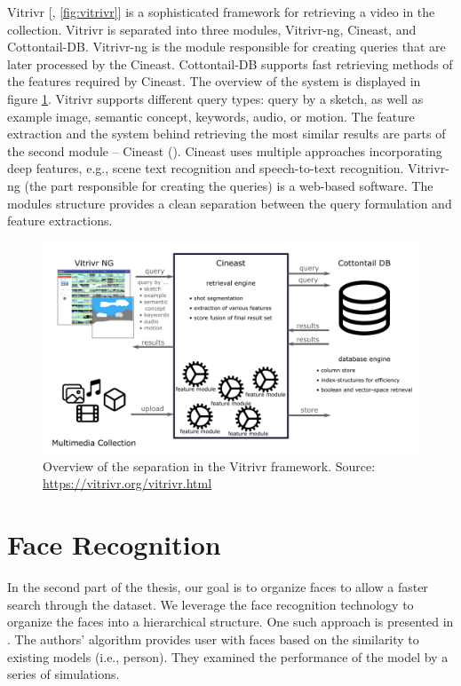 Vitrivr [\cite{rossetto2016vitrivr}, \autoref{fig:vitrivr}] is a sophisticated framework for retrieving a video in the collection. Vitrivr is separated into three modules, Vitrivr-ng, Cineast, and Cottontail-DB.  Vitrivr-ng is the module responsible for creating queries that are later processed by the Cineast. Cottontail-DB supports fast retrieving methods of the features required by Cineast. The overview of the system is displayed in figure \ref{fig:vitrivr}. Vitrivr supports different query types: query by a sketch, as well as example image, semantic concept, keywords, audio, or motion. The feature extraction and the system behind retrieving the most similar results are parts of the second module -- Cineast (\cite{rossetto2016searching}). Cineast uses multiple approaches incorporating deep features, e.g., scene text recognition and speech-to-text recognition. Vitrivr-ng (the part responsible for creating the queries) is a web-based software. The modules structure provides a clean separation between the query formulation and feature extractions.

\begin{figure}
    \centering
    \includegraphics[width=\linewidth]{img/vitrivr.png}
    \caption[Overview of the separation in the Vitrivr framework]{Overview of the separation in the Vitrivr framework. Source: \url{https://vitrivr.org/vitrivr.html}}
    \label{fig:vitrivr}
\end{figure}

\section{Face Recognition}

In the second part of the thesis, our goal is to organize faces to allow a faster search through the dataset. We leverage the face recognition technology to organize the faces into a hierarchical structure. One such approach is presented in \citep{girgensohn2004leveraging}. The authors' algorithm provides user with faces based on the similarity to existing models (i.e., person). They examined the performance of the model by a series of simulations. 

